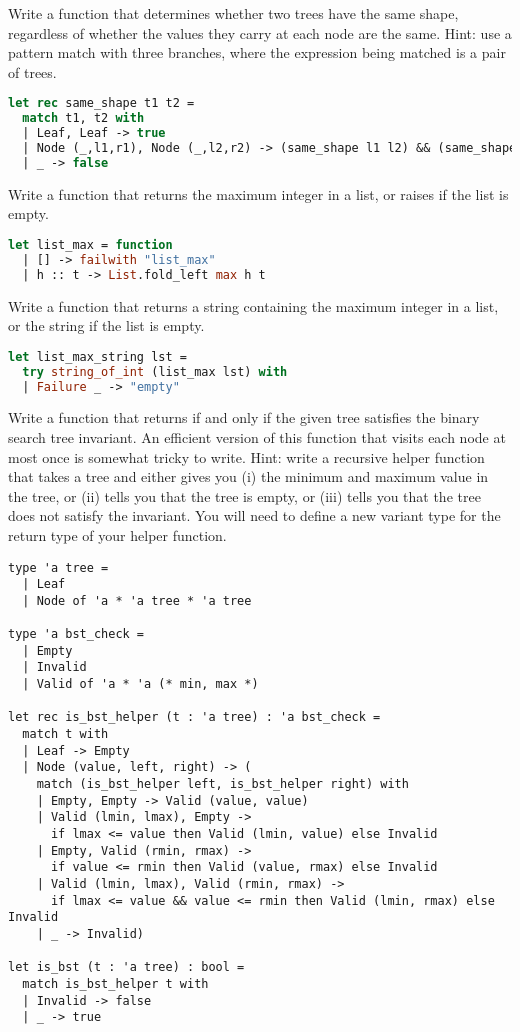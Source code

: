 \problem[shape]
Write a function  that determines whether two trees have the same shape, regardless of whether the values they carry at each node are the same. Hint: use a pattern match with three branches, where the expression being matched is a pair of trees.

\begin{lstlisting}[language=OCaml]
let rec same_shape t1 t2 =
  match t1, t2 with
  | Leaf, Leaf -> true
  | Node (_,l1,r1), Node (_,l2,r2) -> (same_shape l1 l2) && (same_shape r1 r2)
  | _ -> false
\end{lstlisting}

Write a function  that returns the maximum integer in a list, or raises  if the list is empty.

\begin{lstlisting}[language=OCaml]
let list_max = function
  | [] -> failwith "list_max"
  | h :: t -> List.fold_left max h t
\end{lstlisting}

Write a function  that returns a string containing the maximum integer in a list, or the string  if the list is empty.

\begin{lstlisting}[language=OCaml]
let list_max_string lst =
  try string_of_int (list_max lst) with
  | Failure _ -> "empty"
\end{lstlisting}

\problem[is bst]
Write a function  that returns  if and only if the given tree satisfies the binary search tree invariant. An efficient version of this function that visits each node at most once is somewhat tricky to write. Hint: write a recursive helper function that takes a tree and either gives you (i) the minimum and maximum value in the tree, or (ii) tells you that the tree is empty, or (iii) tells you that the tree does not satisfy the invariant. You will need to define a new variant type for the return type of your helper function.

\begin{lstlisting}
type 'a tree =
  | Leaf
  | Node of 'a * 'a tree * 'a tree

type 'a bst_check =
  | Empty
  | Invalid
  | Valid of 'a * 'a (* min, max *)

let rec is_bst_helper (t : 'a tree) : 'a bst_check =
  match t with
  | Leaf -> Empty
  | Node (value, left, right) -> (
    match (is_bst_helper left, is_bst_helper right) with
    | Empty, Empty -> Valid (value, value)
    | Valid (lmin, lmax), Empty ->
      if lmax <= value then Valid (lmin, value) else Invalid
    | Empty, Valid (rmin, rmax) ->
      if value <= rmin then Valid (value, rmax) else Invalid
    | Valid (lmin, lmax), Valid (rmin, rmax) ->
      if lmax <= value && value <= rmin then Valid (lmin, rmax) else Invalid
    | _ -> Invalid)

let is_bst (t : 'a tree) : bool =
  match is_bst_helper t with
  | Invalid -> false
  | _ -> true
\end{lstlisting}

